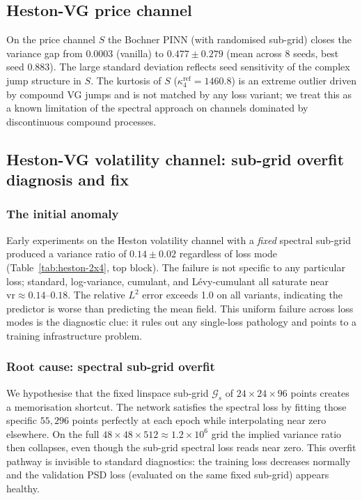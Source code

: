 \documentclass[review,12pt]{elsarticle}
\begin{document}
\subsection{Heston-VG price channel}

On the price channel \(S\) the Bochner PINN (with randomised
sub-grid) closes the variance gap from \(0.0003\) (vanilla) to
\(0.477 \pm 0.279\) (mean across 8 seeds, best seed 0.883). The
large standard deviation reflects seed sensitivity of the complex
jump structure in \(S\). The kurtosis of \(S\) (\(\kappa_4^{\mathrm{ref}}
= 1460.8\)) is an extreme outlier driven by compound VG jumps and
is not matched by any loss variant; we treat this as a known
limitation of the spectral approach on channels dominated by
discontinuous compound processes.

\subsection{Heston-VG volatility channel: sub-grid overfit diagnosis and fix}
\label{subsec:heston-diag}

\subsubsection{The initial anomaly}

Early experiments on the Heston volatility channel with a
\emph{fixed} spectral sub-grid produced a variance ratio of
\(0.14 \pm 0.02\) regardless of loss mode (Table~\ref{tab:heston-2x4},
top block). The failure is not specific to any particular loss;
standard, log-variance, cumulant, and L\'evy-cumulant all saturate
near \(\mathrm{vr} \approx 0.14\)--\(0.18\). The relative \(L^2\)
error exceeds 1.0 on all variants, indicating the predictor is
worse than predicting the mean field. This uniform failure across
loss modes is the diagnostic clue: it rules out any single-loss
pathology and points to a training infrastructure problem.

\subsubsection{Root cause: spectral sub-grid overfit}

We hypothesise that the fixed linspace sub-grid \(\mathcal{G}_s\)
of \(24\times24\times96\) points creates a memorisation shortcut.
The network satisfies the spectral loss by fitting those specific
\(55{,}296\) points perfectly at each epoch while interpolating near
zero elsewhere. On the full \(48\times48\times512 \approx 1.2\times10^6\)
grid the implied variance ratio then collapses, even though the
sub-grid spectral loss reads near zero. This overfit pathway is
invisible to standard diagnostics: the training loss decreases
normally and the validation PSD loss (evaluated on the same fixed
sub-grid) appears healthy.
\end{document}
